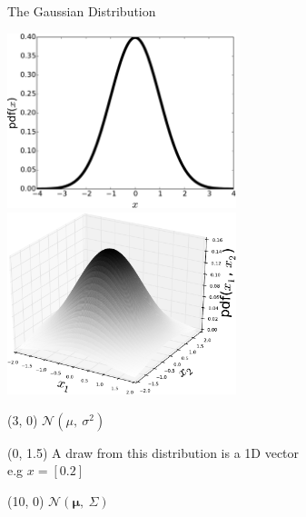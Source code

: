 \documentclass[pdf]{beamer}
\begin{document}
\begin{frame}{The Gaussian Distribution}
\begin{center}
	\includegraphics[width=0.5\textwidth]{Gaussian1D.pdf}
	\includegraphics[width=0.5\textwidth]{Gaussian2D.pdf}
\end{center}

\begin{textblock}{8}(3, 0) %
$\mathcal{N}(\mu,\ \sigma^2)$
\end{textblock}

\begin{textblock}{8}(0, 1.5) %
\scriptsize
A draw from this distribution is a 1D vector\\
e.g $x=[0.2]$
\end{textblock}

\begin{textblock}{8}(10, 0) %
$\mathcal{N}(\boldsymbol{\mu},\ \Sigma)$
\end{textblock}


\end{frame}
\end{document}
